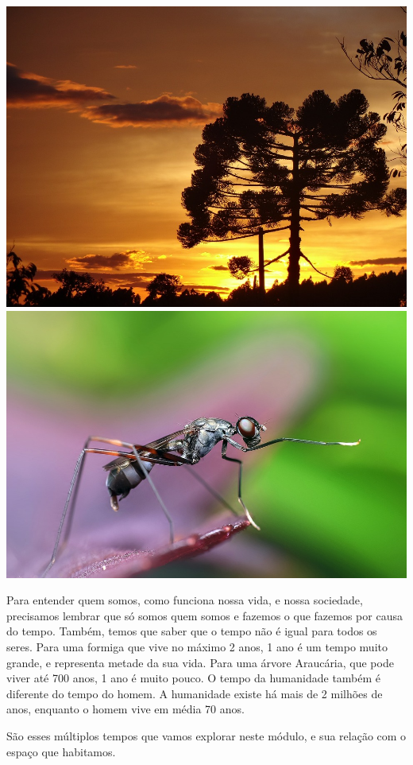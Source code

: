 {\includegraphics[width=.5\textwidth]{./imgs/img27.png}
\includegraphics[width=.5\textwidth]{./imgs/img28.png}


Para entender quem somos, como funciona nossa vida, e nossa sociedade,
precisamos lembrar que só somos quem somos e fazemos o que fazemos por
causa do tempo. Também, temos que saber que o tempo não é igual para
todos os seres. Para uma formiga que vive no máximo 2 anos, 1 ano é um
tempo muito grande, e representa metade da sua vida. Para uma árvore
Araucária, que pode viver até 700 anos, 1 ano é muito pouco. O tempo da
humanidade também é diferente do tempo do homem. A humanidade existe há
mais de 2 milhões de anos, enquanto o homem vive em média 70 anos.

São esses múltiplos tempos que vamos explorar neste módulo, e sua
relação com o espaço que habitamos.}







